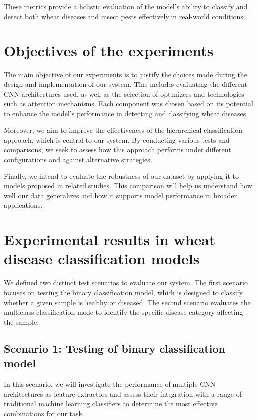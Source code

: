 These metrics provide a holistic evaluation of the model's ability to classify and detect both wheat diseases and insect pests effectively in real-world conditions.



\section{Objectives of the experiments}
The main objective of our experiments is to justify the choices made during the design and implementation of our system. This includes evaluating the different CNN architectures used, as well as the selection of optimizers and technologies such as attention mechanisms. Each component was chosen based on its potential to enhance the model’s performance in detecting and classifying wheat diseases.

Moreover, we aim to improve the effectiveness of the hierarchical classification approach, which is central to our system. By conducting various tests and comparisons, we seek to assess how this approach performs under different configurations and against alternative strategies.

Finally, we intend to evaluate the robustness of our dataset by applying it to models proposed in related studies. This comparison will help us understand how well our data generalizes and how it supports model performance in broader applications.


\section{Experimental results in wheat disease classification models}

We defined two distinct test scenarios to evaluate our system. The first scenario focuses on testing the binary classification model, which is designed to classify whether a given sample is healthy or diseased. The second scenario evaluates the multiclass classification mode to identify the specific disease category affecting the sample.

\subsection{Scenario 1: Testing of binary classification model}
In this scenario, we will investigate the performance of multiple CNN architectures as feature extractors and assess their integration with a range of traditional machine learning classifiers to determine the most effective combinations for our task.
